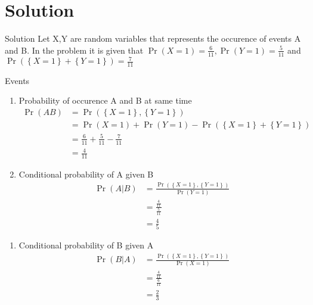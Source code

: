 \documentclass{beamer}
\providecommand{\pr}[1]{\ensuremath{\Pr\left(#1\right)}}
\providecommand{\cbrak}[1]{\ensuremath{\left\{#1\right\}}}
\newcounter{saveenumi}
\newcommand{\seti}{\setcounter{saveenumi}{\value{enumi}}}
\newcommand{\conti}{\setcounter{enumi}{\value{saveenumi}}}
\begin{document}
	\section{Solution}	
	\begin{frame}{Solution}
		Let X,Y are random variables that represents the occurence of events A and B. In the problem it is given that 
			$\pr{X=1}=\frac{6}{11},\pr{Y=1}=\frac{5}{11}$ and $\pr{\cbrak{X=1} +\cbrak{Y=1}}=\frac{7}{11}$
	\begin{table}[ht!]
	\centering
	
	\caption{Events}
	\label{table:1}
    \end{table}
	\end{frame}

	\begin{frame}{}
		\begin{enumerate}
			\item Probability of occurence A and B at same time
			\begin{align}
				\pr{AB}&=\pr{\cbrak{X=1},\cbrak{Y=1}}
				\\
				&=\pr{X=1}+\pr{Y=1}-\pr{\cbrak{X=1}+\cbrak{Y=1}}    
				\\
				&=\frac{6}{11}+\frac{5}{11}-\frac{7}{11}
				\\
				&=\frac{4}{11}     
			\end{align}
			\item Conditional probability of A given B
			\begin{align}
				\pr{A|B}&=\frac{\pr{\cbrak{X=1},\cbrak{Y=1}}}{\pr{Y=1}}\\
				&=\frac{\frac{4}{11}}{\frac{5}{11}}\\
				&=\frac{4}{5}
			\end{align}
		\seti
		\end{enumerate}
	\end{frame}

\begin{frame}{}
	\begin{enumerate}
		\conti
		\item Conditional probability  of B given A
	\begin{align}
		\pr{B|A}&=\frac{\pr{\cbrak{X=1},\cbrak{Y=1}}}{\pr{X=1}}\\
		&=\frac{\frac{4}{11}}{\frac{6}{11}}\\
		&=\frac{2}{3}
	\end{align}
\end{enumerate}
\end{frame}
\end{document}
